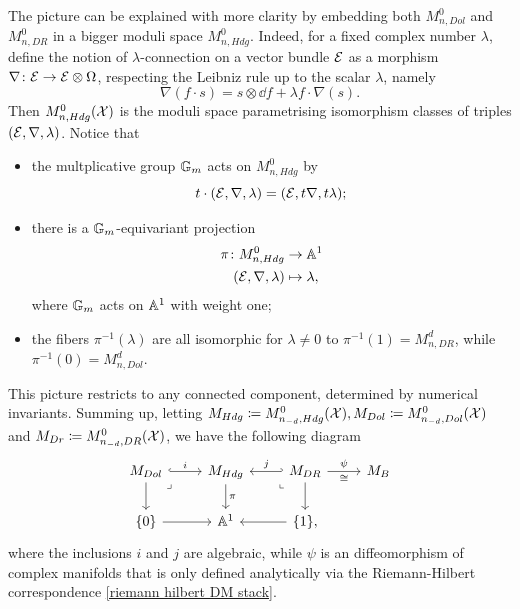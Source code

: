 The picture can be explained with more clarity by embedding both $M_{n, Dol}^0$ and $M_{n, DR}^0$ in a bigger moduli space $M_{n, Hdg}^0$. Indeed, for a fixed complex number $\lambda$, define the notion of $\lambda$-connection on a vector bundle $\mathcal{E}$ as a morphism $\nabla\colon \mathcal{E} \to \mathcal{E} \otimes \Omega$, respecting the Leibniz rule up to the scalar $\lambda$, namely
\[
\nabla(f \cdot s) = s \otimes \dd f + \lambda f \cdot \nabla(s).
\]
Then $M_{n, Hdg}^0(\mathcal{X})$ is the moduli space parametrising isomorphism classes of triples $(\mathcal{E}, \nabla, \lambda)$. Notice that
\begin{itemize}
	\item the multplicative group $\mathbb{G}_m$ acts on $M_{n, Hdg}^{0}$ by
	\[
	t \cdot (\mathcal{E}, \nabla, \lambda) = (\mathcal{E}, t \nabla, t \lambda);
	\]
	\item there is a $\mathbb{G}_m$-equivariant projection
	\begin{align}
	\pi\colon M_{n, Hdg}^0 &\to \mathbb{A}^1 \\
	(\mathcal{E}, \nabla, \lambda) &\mapsto \lambda,
	\end{align}
	where $\mathbb{G}_m$ acts on $\mathbb{A}^1$ with weight one;
	\item the fibers $\pi^{-1}(\lambda)$ are all isomorphic for $\lambda \neq 0$ to $\pi^{-1}(1) = M_{n, DR}^d$, while $\pi^{-1}(0)= M_{n, Dol}^d$.
\end{itemize}
This picture restricts to any connected component, determined by numerical invariants. Summing up, letting $M_{Hdg} \coloneqq M_{n_{-d}, Hdg}^0(\mathcal{X}), M_{Dol} \coloneqq M_{n_{-d}, Dol}^0(\mathcal{X})$ and $M_{Dr} \coloneqq M_{n_{-d}, DR}^0(\mathcal{X})$, we have the following diagram
\begin{equation}
\begin{tikzcd}
	{M_{Dol}} & {M_{Hdg}} & {M_{DR}} & {M_B} \\
	{\{ 0 \}} & {\Ab^1} & {\{ 1 \},}
	\arrow["i", hook, from=1-1, to=1-2]
	\arrow[from=1-1, to=2-1]
	\arrow["\lrcorner"{anchor=center, pos=0.125}, draw=none, from=1-1, to=2-2]
	\arrow["\pi", from=1-2, to=2-2]
	\arrow["j"', hook', from=1-3, to=1-2]
	\arrow["\psi", "\cong"', from=1-3, to=1-4]
	\arrow["\lrcorner"{anchor=center, pos=0.125, rotate=-90}, draw=none, from=1-3, to=2-2]
	\arrow[from=1-3, to=2-3]
	\arrow[from=2-1, to=2-2]
	\arrow[from=2-3, to=2-2]
\end{tikzcd}
\end{equation}
where the inclusions $i$ and $j$ are algebraic, while $\psi$ is an diffeomorphism of complex manifolds that is only defined analytically via the Riemann-Hilbert correspondence \eqref{riemann hilbert DM stack}.

